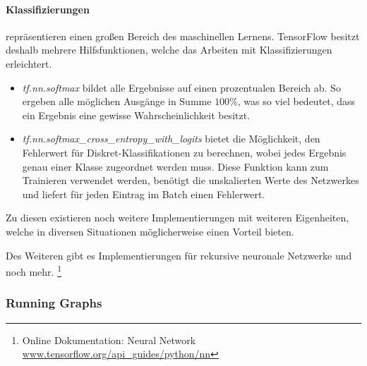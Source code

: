 \paragraph{Klassifizierungen} repräsentieren einen großen Bereich des maschinellen Lernens. 
TensorFlow besitzt deshalb mehrere Hilfsfunktionen, welche das Arbeiten mit Klassifizierungen erleichtert. 
\begin{itemize}
	\item \textit{tf.nn.softmax} bildet alle Ergebnisse auf einen prozentualen Bereich ab. 
	So ergeben alle möglichen Ausgänge in Summe $100\%$, was so viel bedeutet, dass ein Ergebnis eine gewisse Wahrscheinlichkeit besitzt. 
	\item \textit{tf.nn.softmax\_cross\_entropy\_with\_logits} bietet die Möglichkeit, den Fehlerwert für Diskret-Klassifikationen zu berechnen, wobei jedes Ergebnis genau einer Klasse zugeordnet werden muss. 
	Diese Funktion kann zum Trainieren verwendet werden, benötigt die unskalierten Werte des Netzwerkes und liefert für jeden Eintrag im Batch einen Fehlerwert. 
\end{itemize}
\phantom \newline

\noindent
Zu diesen existieren noch weitere Implementierungen mit weiteren Eigenheiten, welche in diversen Situationen möglicherweise einen Vorteil bieten. 
\phantom \newline

\noindent
Des Weiteren gibt es Implementierungen für rekursive neuronale Netzwerke und noch mehr. 
\footnote{Online Dokumentation: Neural Network \url{www.tensorflow.org/api_guides/python/nn}}

\subsubsection{Running Graphs}

